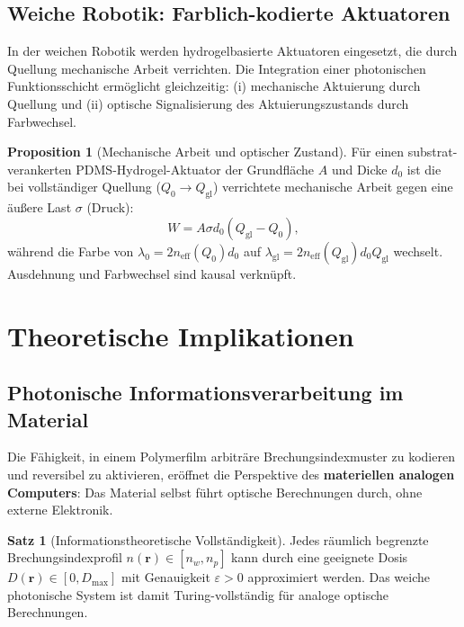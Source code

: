 ﻿\documentclass[a4paper,12pt]{article}
\theoremstyle{definition}
\newtheorem{satz}{Satz}[section]
\newtheorem{proposition}{Proposition}[section]
\newcommand{\neff}{n_\mathrm{eff}}
\newcommand{\vect}[1]{\bm{#1}}
\begin{document}
	\subsection{Weiche Robotik: Farblich-kodierte Aktuatoren}
	
	In der weichen Robotik werden hydrogelbasierte Aktuatoren eingesetzt,
	die durch Quellung mechanische Arbeit verrichten. Die Integration einer
	photonischen Funktionsschicht ermöglicht gleichzeitig:
	(i) mechanische Aktuierung durch Quellung und
	(ii) optische Signalisierung des Aktuierungszustands durch Farbwechsel.
	
	\begin{proposition}[Mechanische Arbeit und optischer Zustand]
		\label{prop:aktuator}
		Für einen substrat-verankerten PDMS-Hydrogel-Aktuator der Grundfläche $A$
		und Dicke $d_0$ ist die bei vollständiger Quellung ($Q_0 \to Q_\mathrm{gl}$)
		verrichtete mechanische Arbeit gegen eine äußere Last $\sigma$ (Druck):
		\begin{equation}
			W = A \sigma d_0 (Q_\mathrm{gl} - Q_0),
			\label{eq:arbeit}
		\end{equation}
		während die Farbe von $\lambda_0 = 2\neff(Q_0)d_0$ auf
		$\lambda_\mathrm{gl} = 2\neff(Q_\mathrm{gl})d_0 Q_\mathrm{gl}$
		wechselt. Ausdehnung und Farbwechsel sind kausal verknüpft.
	\end{proposition}
	
	\section{Theoretische Implikationen}
	\label{sec:implikationen}
	
	\subsection{Photonische Informationsverarbeitung im Material}
	
	Die Fähigkeit, in einem Polymerfilm arbiträre Brechungsindexmuster zu
	kodieren und reversibel zu aktivieren, eröffnet die Perspektive des
	\textbf{materiellen analogen Computers}: Das Material selbst führt optische
	Berechnungen durch, ohne externe Elektronik.
	
	\begin{satz}[Informationstheoretische Vollständigkeit]
		\label{satz:vollstaendigkeit}
		Jedes räumlich begrenzte Brechungsindexprofil $n(\vect{r}) \in [n_w, n_p]$
		kann durch eine geeignete Dosis $D(\vect{r}) \in [0, D_\mathrm{max}]$
		mit Genauigkeit $\varepsilon > 0$ approximiert werden. Das weiche photonische
		System ist damit Turing-vollständig für analoge optische Berechnungen.
	\end{satz}
	
\end{document}
